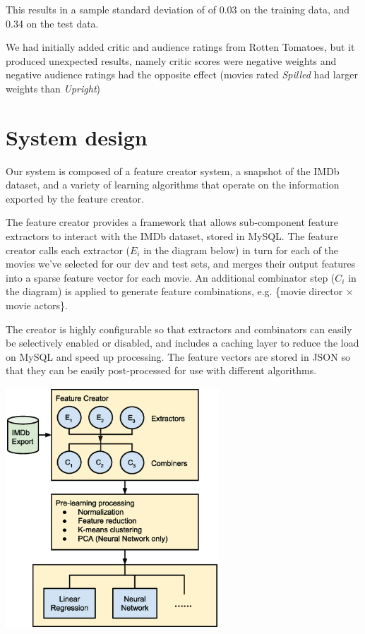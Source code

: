 \documentclass[journal]{IEEEtran}
\begin{document}
This results in a sample standard deviation of of 0.03 on the training data, and 0.34 on the test data.
\\
\par We had initially added critic and audience ratings from Rotten Tomatoes, but it produced unexpected results, namely critic scores were negative weights and negative audience ratings had the opposite effect (movies rated \emph{Spilled} had larger weights than \emph{Upright})

\section{System design}
Our system is composed of a feature creator system, a snapshot of the IMDb dataset,
and a variety of learning algorithms that operate on the information exported by
the feature creator.
\par The feature creator provides a framework that allows sub-component
feature extractors to interact with the IMDb dataset, stored in MySQL.  The feature
creator calls each extractor ($E_i$ in the diagram below) in turn for each of the movies we've selected for our
dev and test sets, and merges their output features into a sparse feature vector for
each movie.  An additional combinator step ($C_i$ in the diagram) is applied to generate feature
combinations, e.g. \{movie director $\times$ movie actors\}.
\par The creator is highly configurable so that extractors and combinators can easily be selectively enabled or disabled,
and includes a caching layer to reduce the load on MySQL and speed up processing.
The feature vectors are stored in JSON so that they can be easily
post-processed for use with different algorithms. \\

\begin{center}
    \includegraphics[width=8cm]{charts/system.eps}
\end{center}
\end{document}
